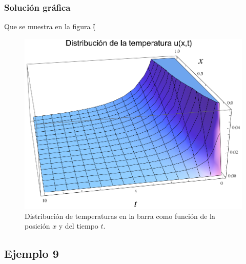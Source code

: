 \begin{frame}
\frametitle{Solución gráfica}
Que se muestra en la figura (\r
\end{frame}
\begin{frame}[plain]
\begin{figure}[H]
    \centering
    \includegraphics[scale=0.8]{Imagenes/Plot_Ejemplo_06_02.eps}
    \caption{Distribución de temperaturas en la barra como función de la posición $x$ y del tiempo $t$.}
    \label{fig:figura_plot_Ejemplo_06_02}
\end{figure}
\end{frame}

\subsection*{Ejemplo 9}

